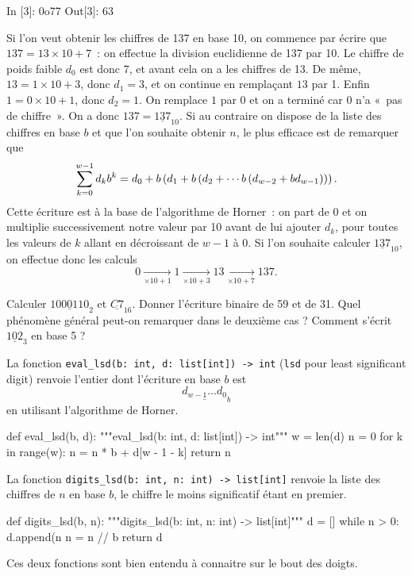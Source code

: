 \documentclass{magnolia}
\begin{document}
\begin{remarques}
\begin{pythoncode}
In [3]: 0o77
Out[3]: 63
\end{pythoncode}
\remarque Si l'on veut obtenir les chiffres de 137 en base 10, on commence par écrire
  que $137 = 13 \times 10 + 7$~: on effectue la division euclidienne de 137 par 10.
  Le chiffre de poids faible $d_0$ est donc $7$, et avant cela on a les chiffres de 13. 
  De même, $13 = 1 \times 10 + 3$, donc $d_1 = 3$, et on continue en remplaçant $13$ par 1. Enfin
  $1 = 0 \times 10 + 1$, donc $d_2 = 1$. On remplace $1$ par $0$ et on a terminé car $0$
  n'a «~pas de chiffre~». On a donc $137 = \underline{137}_{10}$.
\remarque Si au contraire on dispose de la liste des chiffres en base $b$ et que l'on
  souhaite obtenir $n$, le plus efficace est de remarquer  que
  \[\sum_{k = 0}^{w-1} d_k b^k
  = d_0 + b\left(d_1 + b\left(d_2 + \cdots b \left(d_{w-2} + b d_{w-1}\right)\right)\right).\]
  Cette écriture est à la base de l'algorithme de Horner~: on part de 0 et on
  multiplie successivement notre valeur par 10 avant de lui ajouter $d_k$, pour toutes
  les valeurs de $k$ allant en décroissant de $w-1$ à $0$. Si l'on souhaite
  calculer $\underline{137}_{10}$, on effectue donc les calculs
  \[
    0 \xrightarrow[\times 10+1]{}  1
    \xrightarrow[\times 10+3]{}  13
    \xrightarrow[\times 10+7]{} 137.
  \]
\end{remarques}

\begin{exos}
  \exo Calculer $\underline{1000110}_2$ et $\underline{C7}_{16}$.
  \exo Donner l'écriture binaire de 59 et de 31. Quel phénomène général peut-on
    remarquer dans le deuxième cas ?
  \exo Comment s'écrit $\underline{102}_3$ en base 5 ?
\end{exos}
\vspace{2ex}
La fonction \verb!eval_lsd(b: int, d: list[int]) -> int! (\verb!lsd! pour
  least significant digit)
  renvoie l'entier dont l'écriture en base $b$ est \[\underline{d_{w - 1}\dots d_{0}}_{b}\]
  en utilisant l'algorithme de Horner.
\begin{pythoncodeline}
def eval_lsd(b, d):
    """eval_lsd(b: int, d: list[int]) -> int"""
    w = len(d)
    n = 0
    for k in range(w):
        n = n * b + d[w - 1 - k]
    return n
\end{pythoncodeline}

La fonction \verb!digits_lsd(b: int, n: int) -> list[int]!
  renvoie la liste des chiffres de $n$ en base $b$, le chiffre le moins significatif étant en premier.
\begin{pythoncodeline}
def digits_lsd(b, n):
    """digits_lsd(b: int, n: int) -> list[int]"""
    d = []
    while n > 0:
        d.append(n %
        n = n // b
    return d
\end{pythoncodeline}
Ces deux fonctions sont bien entendu à connaitre sur le bout des doigts.\\
\end{document}

